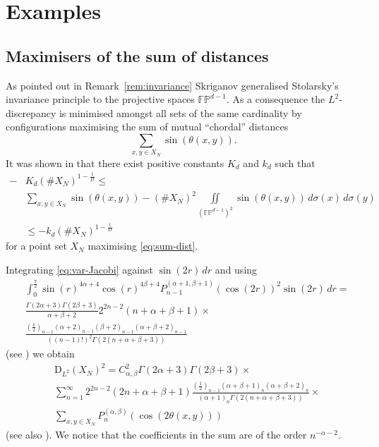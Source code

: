 \section{Examples}\label{sec:examples}

\subsection{Maximisers of the sum of distances}
\label{sec:maxim-sum-dist}
As pointed out in Remark~\ref{rem:invariance} Skriganov
\cite{Skriganov2020:stolarskys_invariance_principle} generalised Stolarsky's
invariance principle \cite{Stolarsky1973:sums_distances_sphere} to the
projective spaces $\mathbb{FP}^{d-1}$. As a consequence the $L^2$-discrepancy
is minimised amongst all sets of the same cardinality by configurations
maximising the sum of mutual ``chordal'' distances
\begin{equation}\label{eq:sum-dist}
  \sum_{x,y\in X_N}\sin(\theta(x,y)).
\end{equation}
It was shown in \cite{Skriganov2019:point_distributions_homogeneous} that there
exist positive constants $K_d$ and $k_d$ such that
\begin{equation}
  \label{eq:skriganov}
  \begin{split}
  -&K_d(\#X_N)^{1-\frac1D}\leq\\
  &\sum_{x,y\in X_N}\sin(\theta(x,y))-(\#X_N)^2\iint\limits_{(\mathbb{FP}^{d-1})^2}
  \sin(\theta(x,y))\,d\sigma(x)\,d\sigma(y)\\
  &\leq-k_d(\#X_N)^{1-\frac1D}
  \end{split}
\end{equation}
for a point set $X_N$ maximising \eqref{eq:sum-dist}.

Integrating \eqref{eq:var-Jacobi} against $\sin(2r)\,dr$ and using
\begin{align*}
  &\int_0^{\frac\pi2}\sin(r)^{4\alpha+4}\cos(r)^{4\beta+4}
  P_{n-1}^{(\alpha+1,\beta+1)}(\cos(2r))^2\sin(2r)\,dr=\\
  &\frac{\Gamma(2\alpha+3)\Gamma(2\beta+3)}{\alpha+\beta+2}
  2^{2n-2}(n+\alpha+\beta+1)\times\\
  &\frac{(\frac12)_{n-1}(\alpha+2)_{n-1}(\beta+2)_{n-1}(\alpha+\beta+2)_{n-1}}
  {((n-1)!)^2\Gamma(2(n+\alpha+\beta+3))}
\end{align*}
(see \cite{Skriganov2020:stolarskys_invariance_principle})
we obtain
\begin{equation}
  \label{eq:l2-discr}
  \begin{split}
    &\mathrm{D}_{L^2}(X_N)^2=C_{\alpha,\beta}^2\Gamma(2\alpha+3)\Gamma(2\beta+3)
    \times\\
    &\sum_{n=1}^\infty 2^{2n-2}(2n+\alpha+\beta+1)
    \frac{(\frac12)_{n-1}(\alpha+\beta+1)_n(\alpha+\beta+2)_n}
    {(\alpha+1)_n\Gamma(2(n+\alpha+\beta+3))}\times\\
    &\sum_{x,y\in X_N}
    P_n^{(\alpha,\beta)}(\cos(2\theta(x,y)))
  \end{split}
\end{equation}
(see also \cite{Skriganov2020:stolarskys_invariance_principle,
  Skriganov2019:stolarskys_invariance_principle_ii}).
We notice that the coefficients in the sum are of the order $n^{-\alpha-2}$.

